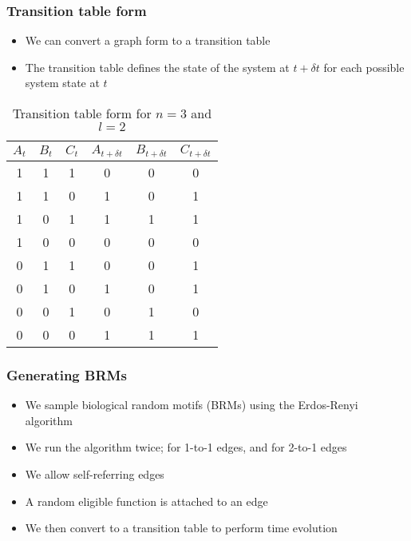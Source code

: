 \documentclass[hyperref={pdfpagelabels=false}]{beamer}
\begin{document}
\begin{frame}
\frametitle{Transition table form}
\begin{itemize}
\item We can convert a graph form to a transition table
\item The transition table defines the state of the system at $t + \delta t$ for each possible system state at $t$
\end{itemize}
\begin{table}[ht]
\begin{center}
\begin{tabular}{|c|c|c||c|c|c|}
\hline
$A_t$ & $B_t$ & $C_t$ & $A_{t+\delta t}$ & $B_{t+\delta t}$ & $C_{t+\delta t}$ \\
\hline
\hline
1 & 1 & 1 & 0 & 0 & 0 \\
1 & 1 & 0 & 1 & 0 & 1 \\
1 & 0 & 1 & 1 & 1 & 1 \\
1 & 0 & 0 & 0 & 0 & 0 \\
0 & 1 & 1 & 0 & 0 & 1 \\
0 & 1 & 0 & 1 & 0 & 1 \\
0 & 0 & 1 & 0 & 1 & 0 \\
0 & 0 & 0 & 1 & 1 & 1 \\
\hline
\end{tabular}
\end{center}
\caption{Transition table form for $n=3$ and $l=2$}
\end{table}
\end{frame}

\begin{frame}
\frametitle{Generating BRMs}
\begin{itemize}
\item We sample biological random motifs (BRMs) using the Erdos-Renyi algorithm \cite{margolin2006aracne}
\item We run the algorithm twice; for 1-to-1 edges, and for 2-to-1 edges
\item We allow self-referring edges
\item A random eligible function is attached to an edge
\item We then convert to a transition table to perform time evolution
\end{itemize}
\end{frame}
\end{document}
